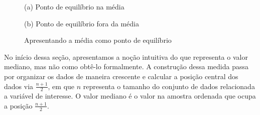 \documentclass[
  letterpaper,
  DIV=11,
  numbers=noendperiod]{scrreprt}
\begin{document}
\begin{figure}

\begin{minipage}[t]{\linewidth}

{\centering 


\caption{(a) Ponto de equilíbrio na média}

}

\end{minipage}%
\newline
\begin{minipage}[t]{\linewidth}

{\centering 


\caption{(b) Ponto de equilíbrio fora da média}

}

\end{minipage}%

\caption{\label{fig-medias}Apresentando a média como ponto de
equilíbrio}

\end{figure}

No início dessa seção, apresentamos a noção intuitiva do que representa
o valor mediano, mas não como obtê-lo formalmente. A construção dessa
medida passa por organizar os dados de maneira crescente e calcular a
posição central dos dados via \(\frac{n+1}{2}\), em que \(n\) representa
o tamanho do conjunto de dados relacionada a variável de interesse. O
valor mediano é o valor na amostra ordenada que ocupa a posição
\(\frac{n+1}{2}\).
\end{document}
